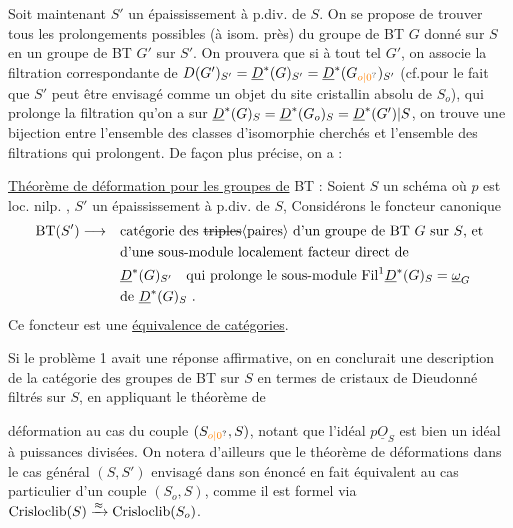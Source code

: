 Soit maintenant $S'$ un épaississement à p.div. de $S$. On se propose de trouver tous les prolongements possibles (à isom. près) du groupe de BT $G$ donné sur $S$ en un groupe de BT $G'$ sur $S'$. On  prouvera que si à tout tel $G'$, on associe la filtration correspondante de $D(G\handwritten{'})_{S'}=\underline{D}^{\handwritten{*}}(G)_{S'}=\underline{D}^{\handwritten{*}}(G_{\unsure{o|0}})_{S'}$ (cf.\qquad pour le fait que $S'$ peut être envisagé comme un objet du site cristallin absolu de $S_o$), qui prolonge la filtration qu'on a sur $\underline{D}^{*}(G)_S=\underline{D}^{*}(G_o)_S=\underline{D}^{*}(G')|S$, on trouve une bijection entre l'ensemble des classes d'isomorphie cherchés et l'ensemble des filtrations qui prolongent. De façon plus précise, on a :

\uline{Théorème de déformation pour les groupes de} BT : Soient $S$ un schéma où $p$ est loc. nilp. , $S'$ un épaississement à p.div. de $S$, Considérons le foncteur canonique
\[
\begin{aligned}
\mathrm{BT}(S')\handwritten{\longrightarrow}\quad&
\text{catégorie des \deleted{triples}\inserted{paires} d'un groupe de BT $G$ sur $S$, et}\\
&\text{d'un\deleted{e} sous-module localement facteur direct de}\\
&\underline{D}^{\handwritten{*}}(G)_{S'}\quad\text{qui prolonge le sous-module }\mathrm{Fil}^{\handwritten{1}}\underline{D}^{\handwritten{*}}(G)_S=\underline{\handwritten{\omega}}_G\\
&\text{de }\underline{D}^{\handwritten{*}}(G)_S\ .
\end{aligned}
\]
Ce foncteur est une \uline{équivalence de catégories}. 

 Si le  problème 1 avait une réponse affirmative, on en conclurait une description de la catégorie des groupes de BT sur $S$ en termes de cristaux de Dieudonné filtrés sur $S$, en appliquant le théorème de

déformation au cas du couple $(S_{\unsure{o|0}},S)$,  notant que l'idéal $p\underline{O}_S$ est bien un idéal à puissances divisées. On notera d'ailleurs que le théorème de déformations dans le cas  général $(S,S')$ envisagé dans son énoncé  en fait équivalent au cas particulier d'un couple $(S_o,S)$, comme il est formel via $\mathrm{Crisloclib}(S)\xrightarrow{\approx}\mathrm{Crisloclib}(S_o)$.

